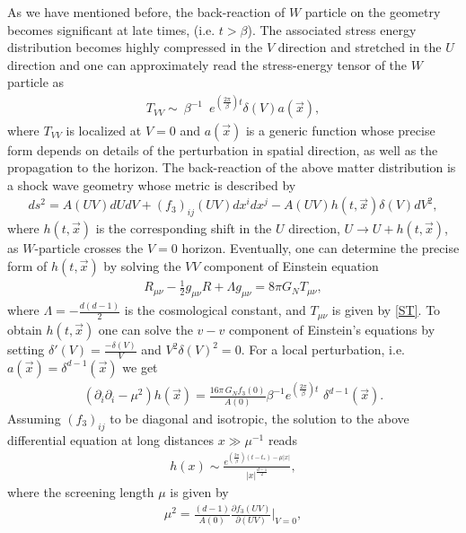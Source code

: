 \documentclass[preprintnumbers,aps,prd,longbibliography,nofootinbib,nobibnotes,amsmath,amssymb]{revtex4}
\begin{document}
As we have mentioned before, the back-reaction of $W$ particle on the geometry  becomes significant at late times, (i.e. $t>\beta$). The associated stress energy distribution becomes  highly compressed in the $V$ direction and stretched in the $U$ direction and one can approximately read the stress-energy tensor of the $W$ particle as 
\begin{align}\label{ST}
T_{VV}\sim\ \beta^{-1}\,\,\,e^{(\frac{2\pi}{\beta})t} \delta (V) a(\vec{x}),
\end{align}
where $T_{VV}$ is localized at $V=0$ and $a(\vec{x})$ is a generic function whose precise form  depends on details of the perturbation in spatial direction, as well as the propagation to the horizon. The  back-reaction of the above matter distribution is a shock wave geometry whose metric is described by
\begin{align}
ds^2=A(UV)dUdV+(f_3)_{ij}(UV)dx^idx^j-A(UV)h(t,\vec{x})\delta (V)dV^2,
\end{align}
where $h(t,\vec{x})$ is the corresponding shift in the $U$ direction,  $U\longrightarrow  U+h(t,\vec{x})$, as $W$-particle crosses the $V=0$ horizon.  Eventually, one can determine the precise form of $h(t,\vec{x})$ by solving the $V V$ component of Einstein equation
\begin{align}
R_{\mu\nu}-\frac{1}{2}g_{\mu\nu}R+\Lambda g_{\mu\nu}=8\pi G_{N} T_{\mu\nu},
\end{align}
where  $\Lambda=-\frac{d(d-1)}{2}$ is the cosmological constant, and $T_{\mu\nu}$ is given by \eqref{ST}. To obtain $h(t,\vec{x})$ one can solve the $v-v$ component of Einstein's equations by setting $\delta'(V)=\frac{-\delta(V)}{V}$ and $V^{2}\delta(V)^{2}=0$. For a local perturbation, i.e. $a(\vec{x})=\delta^{d-1}(\vec{x})$ we get
\begin{align}\label{Shift}
\left(\partial _i\partial _i-\mu ^2\right)h(\vec{x})=\frac{16\pi\, G_{N} f_3(0)}{A(0)}\beta^{-1}e^{(\frac{2\pi}{\beta})t}\,\, \delta^{d-1}(\vec{x}).
\end{align}
Assuming $(f_3)_{ij}$ to be diagonal and isotropic, the solution to the above differential equation  at long distances $x\gg \mu^{-1}$ reads
\begin{align}\label{shock}
h(x)\sim \frac{e^{(\frac{2\pi}{\beta})(t-t_{\ast})-\mu \vert x \vert}}{\vert x \vert^{\frac{d-1}{2}}},
\end{align}
where the screening length $\mu $ is  given by
\begin{align}
\label{screening}\mu ^2=\frac{(d-1)}{A(0)}\frac{\partial f_3(UV)}{\partial (UV)}\bigg\vert_{V=0},
\end{align}
\end{document}
